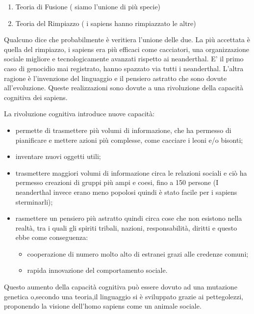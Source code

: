 \documentclass[a4page, 11pt]{article}
\begin{document}
\begin{enumerate}
	\def\labelenumi{\arabic{enumi})}
	 
	\item
	Teoria di Fusione ( siamo l'unione di più specie)
	\item
	Teoria del Rimpiazzo ( i sapiens hanno rimpiazzato le altre)
\end{enumerate}

Qualcuno dice che probabilmente è veritiera l'unione delle due.
La più accettata è quella del rimpiazzo, i sapiens era più efficaci
come cacciatori, una organizzazione sociale migliore e tecnologicamente
avanzati rispetto ai neanderthal. E' il primo caso di genocidio mai
registrato, hanno spazzato via tutti i neanderthal. L'altra ragione è
l'invenzione del linguaggio e il pensiero astratto che sono dovute
all'evoluzione. Queste realizzazioni sono dovute a una rivoluzione della
capacità cognitiva dei sapiens.

La rivoluzione cognitiva introduce nuove capacità:

\begin{itemize}
	\item
	permette di trasmettere più volumi di informazione, che ha permesso di
	pianificare e mettere azioni più complesse, come cacciare i leoni e/o
	bisonti;
	\item
	inventare nuovi oggetti utili;
	\item
	trasmettere maggiori volumi di informazione circa le relazioni sociali
	e ciò ha permesso creazioni di gruppi più ampi e coesi, fino a 150
	persone (I neanderthal invece erano meno popolosi quindi è stato
	facile per i sapiens sterminarli);
	\item
	rasmettere un pensiero più astratto quindi circa cose che non
	esistono nella realtà, tra i quali gli spiriti tribali, nazioni,
	responsabilità, diritti e questo ebbe come conseguenza:
	
	\begin{itemize}
		 
		\item
		cooperazione di numero molto alto di estranei grazi alle credenze
		comuni;
		\item
		rapida innovazione del comportamento sociale.
	\end{itemize}
\end{itemize}

Questo aumento della capacità cognitiva può essere dovuto ad una mutazione genetica
o,secondo una teoria,il linguaggio si è sviluppato grazie ai pettegolezzi,
proponendo la visione dell'homo sapiens come un animale sociale.
\end{document}
